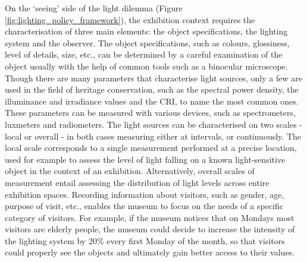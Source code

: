 On the ‘seeing’ side of the light dilemma (Figure \ref{fig:lighting_policy_framework}), the exhibition context requires the characterisation of three main elements: the object specifications, the lighting system and the observer. The object specifications, such as colours, glossiness, level of details, size, etc., can be determined by a careful examination of the object usually with the help of common tools such as a binocular microscope. Though there are many parameters that characterise light sources, only a few are used in the field of heritage conservation, such as the spectral power density, the illuminance and irradiance values and the \gls{CRI}, to name the most common ones. These parameters can be measured with various devices, such as spectrometers, luxmeters and radiometers. The light sources can be characterised  on two scales - local or overall - in both cases measuring either at intervals, or continuously. The local scale corresponds to a single measurement performed at a precise location, used for example to assess the level of light falling on a known light-sensitive object in the context of an exhibition. Alternatively, overall scales of measurement entail assessing the distribution of light levels across entire exhibition spaces. Recording information about visitors, such as gender, age, purpose of visit, etc., enables the museum to focus on the needs of a specific category of visitors. For example, if the museum notices that on Mondays most visitors are elderly people, the museum could decide to increase the intensity of the lighting system by 20\% every first Monday of the month, so that visitors could properly see the objects and ultimately gain better access to their values. \label{par: light characterisation} \\



